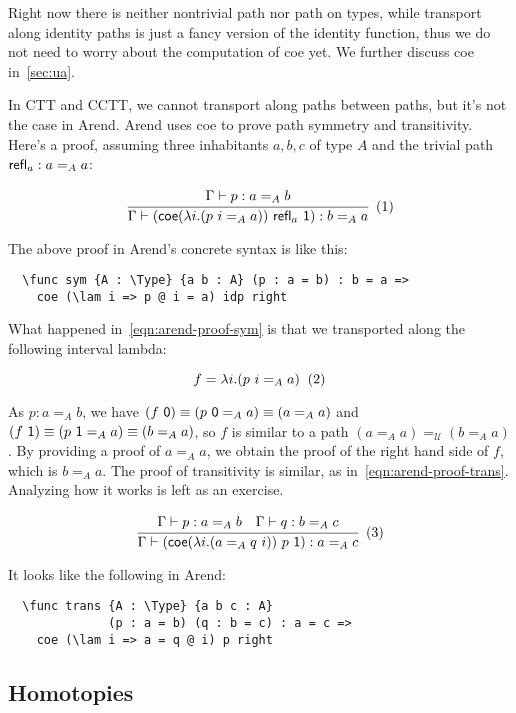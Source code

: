 Right now there is neither nontrivial path nor path on types,
while transport along identity paths is just a fancy version
of the identity function, thus we do not need to worry about the
computation of \textsf{coe} yet.
We further discuss \textsf{coe} in~\cref{sec:ua}.

In CTT and CCTT, we cannot transport along paths between paths,
but it's not the case in Arend.
Arend uses \textsf{coe} to prove path symmetry and transitivity.
Here's a proof, assuming three inhabitants $a, b, c$ of type $A$
and the trivial path $\textsf{refl}_a : a =_A a$:

\[
  \cfrac{
    \Gamma \vdash p : a =_A b
  }{
    \Gamma \vdash (\textsf{coe}
    (\lambda i. (p\ i =_A a)) \ \refl_a \ \textsf 1)
    : b =_A a
  }
  \xtag \label{eqn:arend-proof-sym}
\]

The above proof in Arend's concrete syntax is like this:

\begin{verbatim}
  \func sym {A : \Type} {a b : A} (p : a = b) : b = a =>
    coe (\lam i => p @ i = a) idp right
\end{verbatim}

What happened in~\ref{eqn:arend-proof-sym} is that we transported
along the following interval lambda:

\[
  f = \lambda i. (p\ i =_A a)
  \xtag
\]

As $p : a =_A b$, we have
$(f \ \textsf 0) \equiv (p \ \textsf 0 =_A a) \equiv (a =_A a)$ and
$(f \ \textsf 1) \equiv (p \ \textsf 1 =_A a) \equiv (b =_A a)$,
so $f$ is similar to a path $(a =_A a) =_{\mathcal U} (b =_A a)$.
By providing a proof  of $a =_A a$,
we obtain the proof of the right hand side of $f$, which is $b =_A a$.
The proof of transitivity is similar, as in~\ref{eqn:arend-proof-trans}.
Analyzing how it works is left as an exercise.

\[
  \cfrac{
    \Gamma \vdash p : a =_A b
    \quad
    \Gamma \vdash q : b =_A c
  }{
    \Gamma \vdash (\textsf{coe}
    (\lambda i. (a =_A q\ i)) \ p \ \textsf 1)
    : a =_A c
  }
  \xtag \label{eqn:arend-proof-trans}
\]

It looks like the following in Arend:

\begin{verbatim}
  \func trans {A : \Type} {a b c : A}
              (p : a = b) (q : b = c) : a = c =>
    coe (\lam i => a = q @ i) p right
\end{verbatim}

\subsection{Homotopies}
\label{subsec:hom}

\TODO
